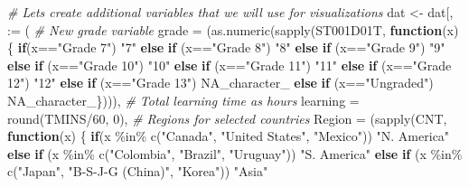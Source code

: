 \documentclass[
]{book}
\newenvironment{Shaded}{\begin{snugshade}}{\end{snugshade}}
\newcommand{\AttributeTok}[1]{\textcolor[rgb]{0.77,0.63,0.00}{#1}}
\newcommand{\CommentTok}[1]{\textcolor[rgb]{0.56,0.35,0.01}{\textit{#1}}}
\newcommand{\ConstantTok}[1]{\textcolor[rgb]{0.00,0.00,0.00}{#1}}
\newcommand{\ControlFlowTok}[1]{\textcolor[rgb]{0.13,0.29,0.53}{\textbf{#1}}}
\newcommand{\DecValTok}[1]{\textcolor[rgb]{0.00,0.00,0.81}{#1}}
\newcommand{\FunctionTok}[1]{\textcolor[rgb]{0.00,0.00,0.00}{#1}}
\newcommand{\NormalTok}[1]{#1}
\newcommand{\OtherTok}[1]{\textcolor[rgb]{0.56,0.35,0.01}{#1}}
\newcommand{\SpecialCharTok}[1]{\textcolor[rgb]{0.00,0.00,0.00}{#1}}
\newcommand{\StringTok}[1]{\textcolor[rgb]{0.31,0.60,0.02}{#1}}
\begin{document}
\begin{Shaded}
\begin{Highlighting}[]
\CommentTok{\# Let\textquotesingle{}s create additional variables that we will use for visualizations}
\NormalTok{dat }\OtherTok{\textless{}{-}}\NormalTok{ dat[, }\StringTok{\textasciigrave{}}\AttributeTok{:=}\StringTok{\textasciigrave{}}\NormalTok{ (}
  \CommentTok{\# New grade variable}
  \AttributeTok{grade =}\NormalTok{ (}\FunctionTok{as.numeric}\NormalTok{(}\FunctionTok{sapply}\NormalTok{(ST001D01T, }\ControlFlowTok{function}\NormalTok{(x) \{}
  \ControlFlowTok{if}\NormalTok{(x}\SpecialCharTok{==}\StringTok{"Grade 7"}\NormalTok{) }\StringTok{"7"}
  \ControlFlowTok{else} \ControlFlowTok{if}\NormalTok{ (x}\SpecialCharTok{==}\StringTok{"Grade 8"}\NormalTok{) }\StringTok{"8"}
  \ControlFlowTok{else} \ControlFlowTok{if}\NormalTok{ (x}\SpecialCharTok{==}\StringTok{"Grade 9"}\NormalTok{) }\StringTok{"9"}
  \ControlFlowTok{else} \ControlFlowTok{if}\NormalTok{ (x}\SpecialCharTok{==}\StringTok{"Grade 10"}\NormalTok{) }\StringTok{"10"}
  \ControlFlowTok{else} \ControlFlowTok{if}\NormalTok{ (x}\SpecialCharTok{==}\StringTok{"Grade 11"}\NormalTok{) }\StringTok{"11"}
  \ControlFlowTok{else} \ControlFlowTok{if}\NormalTok{ (x}\SpecialCharTok{==}\StringTok{"Grade 12"}\NormalTok{) }\StringTok{"12"}
  \ControlFlowTok{else} \ControlFlowTok{if}\NormalTok{ (x}\SpecialCharTok{==}\StringTok{"Grade 13"}\NormalTok{) }\ConstantTok{NA\_character\_}
  \ControlFlowTok{else} \ControlFlowTok{if}\NormalTok{ (x}\SpecialCharTok{==}\StringTok{"Ungraded"}\NormalTok{) }\ConstantTok{NA\_character\_}\NormalTok{\}))),}
  \CommentTok{\# Total learning time as hours}
  \AttributeTok{learning =} \FunctionTok{round}\NormalTok{(TMINS}\SpecialCharTok{/}\DecValTok{60}\NormalTok{, }\DecValTok{0}\NormalTok{),}
  \CommentTok{\# Regions for selected countries}
  \AttributeTok{Region =}\NormalTok{ (}\FunctionTok{sapply}\NormalTok{(CNT, }\ControlFlowTok{function}\NormalTok{(x) \{}
  \ControlFlowTok{if}\NormalTok{(x }\SpecialCharTok{\%in\%} \FunctionTok{c}\NormalTok{(}\StringTok{"Canada"}\NormalTok{, }\StringTok{"United States"}\NormalTok{, }\StringTok{"Mexico"}\NormalTok{)) }\StringTok{"N. America"}
    \ControlFlowTok{else} \ControlFlowTok{if}\NormalTok{ (x }\SpecialCharTok{\%in\%} \FunctionTok{c}\NormalTok{(}\StringTok{"Colombia"}\NormalTok{, }\StringTok{"Brazil"}\NormalTok{, }\StringTok{"Uruguay"}\NormalTok{)) }\StringTok{"S. America"}
    \ControlFlowTok{else} \ControlFlowTok{if}\NormalTok{ (x }\SpecialCharTok{\%in\%} \FunctionTok{c}\NormalTok{(}\StringTok{"Japan"}\NormalTok{, }\StringTok{"B{-}S{-}J{-}G (China)"}\NormalTok{, }\StringTok{"Korea"}\NormalTok{)) }\StringTok{"Asia"}

\end{Highlighting}
\end{Shaded}
\end{document}
